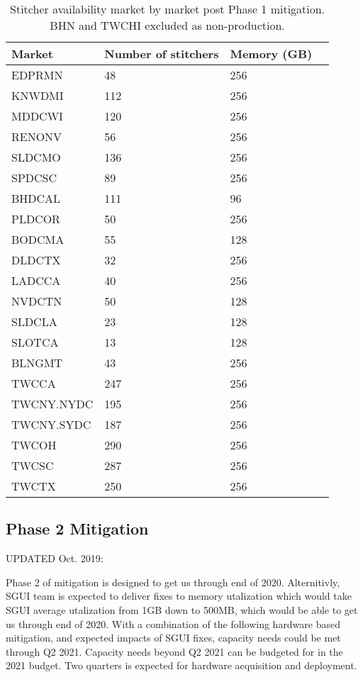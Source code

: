 \documentclass{article}
\begin{document}
\begin{table}
\begin{tabular}{|l|l|l|l|} 
\hline Market & Number of stitchers & Memory (GB)\\
\hline EDPRMN & 48 & 256\\
\hline KNWDMI & 112 & 256\\
\hline MDDCWI & 120 & 256\\
\hline RENONV & 56 & 256\\
\hline SLDCMO & 136 & 256\\
\hline SPDCSC & 89 & 256\\
\hline BHDCAL & 111 & 96\\
\hline PLDCOR & 50 & 256\\
\hline BODCMA & 55 & 128\\
\hline DLDCTX & 32 & 256\\
\hline LADCCA & 40 & 256\\
\hline NVDCTN & 50 & 128\\
\hline SLDCLA & 23 & 128\\
\hline SLOTCA & 13 & 128\\
\hline BLNGMT & 43 & 256\\
\hline TWCCA & 247 & 256\\
\hline TWCNY.NYDC & 195 & 256\\
\hline TWCNY.SYDC & 187 & 256\\
\hline TWCOH & 290 & 256\\
\hline TWCSC & 287 & 256\\
\hline TWCTX & 250 & 256\\
\hline 
\end{tabular}
\caption{\label{TABLE-marketStitcherAvailUpdated}Stitcher availability market by market post Phase 1 mitigation. BHN and TWCHI excluded as non-production.} 
\end{table}

\subsection{Phase 2 Mitigation}
\label{SECTION-Phase2}

UPDATED Oct. 2019:

Phase 2 of mitigation is designed to get us through end of 2020. Alternitivly, SGUI team is expected to deliver fixes to memory utalization which would take SGUI average utalization from 1GB down to 500MB, which would be able to get us through end of 2020. With a combination of the following hardware based mitigation, and expected impacts of SGUI fixes, capacity needs could be met through Q2 2021. Capacity needs beyond Q2 2021 can be budgeted for in the 2021 budget. Two quarters is expected for hardware acquisition and deployment. 
\end{document}
